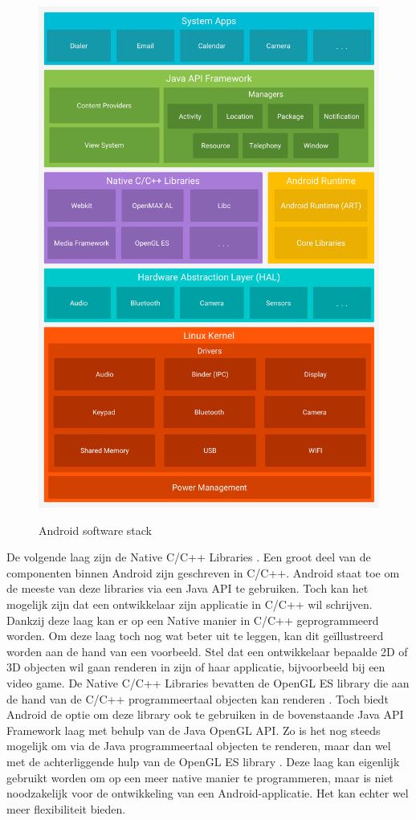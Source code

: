 \begin{figure}
  \centering
  \includegraphics[width=0.9\linewidth]{img/android}
  \caption{Android software stack}
  \label{fig:Android software stack} \autocite{Bron7IMG}
\end{figure}

De volgende laag zijn de Native C/C++ Libraries \autocite{Bron7, Bron13}. Een groot deel van de componenten binnen Android zijn geschreven in C/C++. Android staat toe om de meeste van deze libraries via een Java API te gebruiken. Toch kan het mogelijk zijn dat een ontwikkelaar zijn applicatie in C/C++ wil schrijven. Dankzij deze laag kan er op een Native manier in C/C++ geprogrammeerd worden. Om deze laag toch nog wat beter uit te leggen, kan dit geïllustreerd worden aan de hand van een voorbeeld. Stel dat een ontwikkelaar bepaalde 2D of 3D objecten wil gaan renderen in zijn of haar applicatie, bijvoorbeeld bij een video game. De Native C/C++ Libraries bevatten de OpenGL ES library die aan de hand van de C/C++ programmeertaal objecten kan renderen \autocite{Bron7, Bron13}. Toch biedt Android de optie om deze library ook te gebruiken in de bovenstaande Java API Framework laag met behulp van de Java OpenGL API. Zo is het nog steeds mogelijk om via de Java programmeertaal objecten te renderen, maar dan wel met de achterliggende hulp van de OpenGL ES library \autocite{Bron7}. Deze laag kan eigenlijk gebruikt worden om op een meer native manier te programmeren, maar is niet noodzakelijk voor de ontwikkeling van een Android-applicatie. Het kan echter wel meer flexibiliteit bieden.

